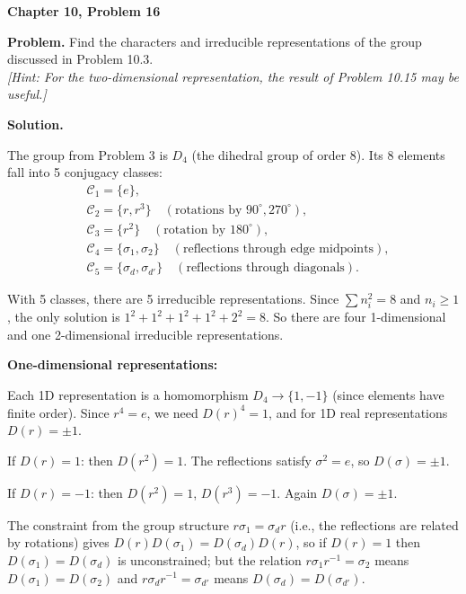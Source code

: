 \documentclass[12pt]{article}
\begin{document}
\begin{center}
{\Large\bfseries Chapter 10, Problem 16}
\end{center}

\noindent\textbf{Problem.} Find the characters and irreducible representations of the group discussed in Problem 10.3. \\
\textit{[Hint: For the two-dimensional representation, the result of Problem 10.15 may be useful.]}

\bigskip
\noindent\textbf{Solution.}

The group from Problem 3 is $D_4$ (the dihedral group of order 8). Its 8 elements fall into 5 conjugacy classes:
\begin{align*}
&\mathcal{C}_1 = \{e\}, \\
&\mathcal{C}_2 = \{r, r^3\} \quad (\text{rotations by } 90^\circ, 270^\circ), \\
&\mathcal{C}_3 = \{r^2\} \quad (\text{rotation by } 180^\circ), \\
&\mathcal{C}_4 = \{\sigma_1, \sigma_2\} \quad (\text{reflections through edge midpoints}), \\
&\mathcal{C}_5 = \{\sigma_d, \sigma_{d'}\} \quad (\text{reflections through diagonals}).
\end{align*}

With 5 classes, there are 5 irreducible representations. Since $\sum n_i^2 = 8$ and $n_i \geq 1$, the only solution is $1^2 + 1^2 + 1^2 + 1^2 + 2^2 = 8$. So there are four 1-dimensional and one 2-dimensional irreducible representations.

\medskip
\noindent\textbf{One-dimensional representations:}

Each 1D representation is a homomorphism $D_4 \to \{1, -1\}$ (since elements have finite order). Since $r^4 = e$, we need $D(r)^4 = 1$, and for 1D real representations $D(r) = \pm 1$.

If $D(r) = 1$: then $D(r^2) = 1$. The reflections satisfy $\sigma^2 = e$, so $D(\sigma) = \pm 1$.

If $D(r) = -1$: then $D(r^2) = 1$, $D(r^3) = -1$. Again $D(\sigma) = \pm 1$.

The constraint from the group structure $r\sigma_1 = \sigma_d r$ (i.e., the reflections are related by rotations) gives $D(r)D(\sigma_1) = D(\sigma_d)D(r)$, so if $D(r) = 1$ then $D(\sigma_1) = D(\sigma_d)$ is unconstrained; but the relation $r\sigma_1 r^{-1} = \sigma_2$ means $D(\sigma_1) = D(\sigma_2)$ and $r\sigma_d r^{-1} = \sigma_{d'}$ means $D(\sigma_d) = D(\sigma_{d'})$.
\end{document}
